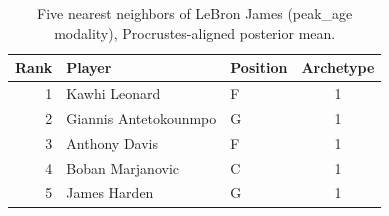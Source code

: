\begin{table}[htbp]
  \centering\small
  \begin{tabular}{rllc}
    \toprule
    Rank & Player & Position & Archetype \\
    \midrule
    1 & Kawhi Leonard & F & 1 \\
    2 & Giannis Antetokounmpo & G & 1 \\
    3 & Anthony Davis & F & 1 \\
    4 & Boban Marjanovic & C & 1 \\
    5 & James Harden & G & 1 \\
    \bottomrule
  \end{tabular}
  \caption{Five nearest neighbors of LeBron James (peak_age modality), Procrustes-aligned posterior mean.}
  \label{tab:LeBron_James_neighbors_peak_age}
\end{table}

